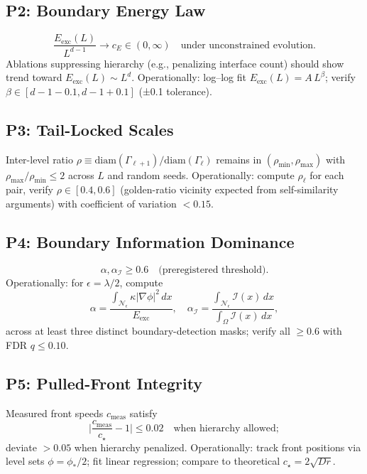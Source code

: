 \documentclass{article}
\begin{document}
\subsection{P2: Boundary Energy Law}

\begin{equation}
\frac{E_{\text{exc}}(L)}{L^{d-1}} \to c_E \in (0,\infty) \quad\text{under unconstrained evolution}.
\end{equation}
Ablations suppressing hierarchy (e.g., penalizing interface count) should show trend toward $E_{\text{exc}}(L)\sim L^{d}$. Operationally: log--log fit $E_{\text{exc}}(L) = A\,L^\beta$; verify $\beta\in[d-1-0.1, d-1+0.1]$ (±0.1 tolerance).

\subsection{P3: Tail-Locked Scales}

Inter-level ratio $\rho\equiv \text{diam}(\Gamma_{\ell+1})/\text{diam}(\Gamma_{\ell})$ remains in $(\rho_{\min},\rho_{\max})$ with $\rho_{\max}/\rho_{\min}\le 2$ across $L$ and random seeds. Operationally: compute $\rho_\ell$ for each pair, verify $\rho\in[0.4,0.6]$ (golden-ratio vicinity expected from self-similarity arguments) with coefficient of variation $<0.15$.

\subsection{P4: Boundary Information Dominance}

\begin{equation}
\alpha, \alpha_\mathcal{I} \ge 0.6 \quad\text{(preregistered threshold)}.
\end{equation}
Operationally: for $\epsilon=\lambda/2$, compute
\begin{equation}
\alpha = \frac{ \int_{\mathcal{N}_\epsilon} \kappa|\nabla\phi|^2\,dx }{ E_{\text{exc}} }, \quad
\alpha_\mathcal{I} = \frac{ \int_{\mathcal{N}_\epsilon} \mathcal{I}(x)\,dx }{ \int_{\Omega}\mathcal{I}(x)\,dx },
\end{equation}
across at least three distinct boundary-detection masks; verify all $\ge 0.6$ with FDR $q\le 0.10$.

\subsection{P5: Pulled-Front Integrity}

Measured front speeds $c_{\text{meas}}$ satisfy
\begin{equation}
\Big|\frac{c_{\text{meas}}}{c_\star} - 1\Big| \le 0.02 \quad\text{when hierarchy allowed};
\end{equation}
deviate $>0.05$ when hierarchy penalized. Operationally: track front positions via level sets $\phi=\phi_\ast/2$; fit linear regression; compare to theoretical $c_\star=2\sqrt{Dr}$.
\end{document}
